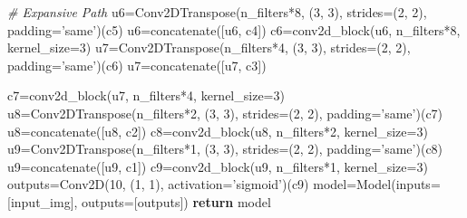 \documentclass[11pt]{article}
\newenvironment{Shaded}{}{}
\newcommand{\DecValTok}[1]{\textcolor[rgb]{0.25,0.63,0.44}{{#1}}}
\newcommand{\StringTok}[1]{\textcolor[rgb]{0.25,0.44,0.63}{{#1}}}
\newcommand{\CommentTok}[1]{\textcolor[rgb]{0.38,0.63,0.69}{\textit{{#1}}}}
\newcommand{\NormalTok}[1]{{#1}}
\newcommand{\ControlFlowTok}[1]{\textcolor[rgb]{0.00,0.44,0.13}{\textbf{{#1}}}}
\newcommand{\OperatorTok}[1]{\textcolor[rgb]{0.40,0.40,0.40}{{#1}}}
\begin{document}
\begin{Shaded}
\begin{Highlighting}[]
 \CommentTok{# Expansive Path}
\NormalTok{ u6}\OperatorTok{=}\NormalTok{Conv2DTranspose(n_filters}\OperatorTok{*}\DecValTok{8}\NormalTok{, (}\DecValTok{3}\NormalTok{, }\DecValTok{3}\NormalTok{), strides}\OperatorTok{=}\NormalTok{(}\DecValTok{2}\NormalTok{, }\DecValTok{2}\NormalTok{), padding}\OperatorTok{=}\StringTok{'same'}\NormalTok{)(c5)}
\NormalTok{ u6}\OperatorTok{=}\NormalTok{concatenate([u6, c4])}
\NormalTok{ c6}\OperatorTok{=}\NormalTok{conv2d_block(u6, n_filters}\OperatorTok{*}\DecValTok{8}\NormalTok{, kernel_size}\OperatorTok{=}\DecValTok{3}\NormalTok{)}
\NormalTok{ u7}\OperatorTok{=}\NormalTok{Conv2DTranspose(n_filters}\OperatorTok{*}\DecValTok{4}\NormalTok{, (}\DecValTok{3}\NormalTok{, }\DecValTok{3}\NormalTok{), strides}\OperatorTok{=}\NormalTok{(}\DecValTok{2}\NormalTok{, }\DecValTok{2}\NormalTok{), padding}\OperatorTok{=}\StringTok{'same'}\NormalTok{)(c6)}
\NormalTok{ u7}\OperatorTok{=}\NormalTok{concatenate([u7, c3])}

\NormalTok{ c7}\OperatorTok{=}\NormalTok{conv2d_block(u7, n_filters}\OperatorTok{*}\DecValTok{4}\NormalTok{, kernel_size}\OperatorTok{=}\DecValTok{3}\NormalTok{)}
\NormalTok{ u8}\OperatorTok{=}\NormalTok{Conv2DTranspose(n_filters}\OperatorTok{*}\DecValTok{2}\NormalTok{, (}\DecValTok{3}\NormalTok{, }\DecValTok{3}\NormalTok{), strides}\OperatorTok{=}\NormalTok{(}\DecValTok{2}\NormalTok{, }\DecValTok{2}\NormalTok{), padding}\OperatorTok{=}\StringTok{'same'}\NormalTok{)(c7)}
\NormalTok{ u8}\OperatorTok{=}\NormalTok{concatenate([u8, c2])}
\NormalTok{ c8}\OperatorTok{=}\NormalTok{conv2d_block(u8, n_filters}\OperatorTok{*}\DecValTok{2}\NormalTok{, kernel_size}\OperatorTok{=}\DecValTok{3}\NormalTok{)}
\NormalTok{ u9}\OperatorTok{=}\NormalTok{Conv2DTranspose(n_filters}\OperatorTok{*}\DecValTok{1}\NormalTok{, (}\DecValTok{3}\NormalTok{, }\DecValTok{3}\NormalTok{), strides}\OperatorTok{=}\NormalTok{(}\DecValTok{2}\NormalTok{, }\DecValTok{2}\NormalTok{), padding}\OperatorTok{=}\StringTok{'same'}\NormalTok{)(c8)}
\NormalTok{ u9}\OperatorTok{=}\NormalTok{concatenate([u9, c1])}
\NormalTok{ c9}\OperatorTok{=}\NormalTok{conv2d_block(u9, n_filters}\OperatorTok{*}\DecValTok{1}\NormalTok{, kernel_size}\OperatorTok{=}\DecValTok{3}\NormalTok{)}
\NormalTok{ outputs}\OperatorTok{=}\NormalTok{Conv2D(}\DecValTok{10}\NormalTok{, (}\DecValTok{1}\NormalTok{, }\DecValTok{1}\NormalTok{), activation}\OperatorTok{=}\StringTok{'sigmoid'}\NormalTok{)(c9)}
\NormalTok{ model}\OperatorTok{=}\NormalTok{Model(inputs}\OperatorTok{=}\NormalTok{[input_img], outputs}\OperatorTok{=}\NormalTok{[outputs])}
 \ControlFlowTok{return}\NormalTok{ model}

\end{Highlighting}
\end{Shaded}
\end{document}
